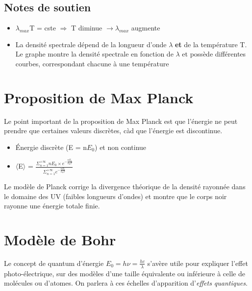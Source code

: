\documentclass{article}
\begin{document}
\subsection{Notes de soutien}
\begin{itemize}
    \item $\lambda_{max}$T = cste $\Longrightarrow$ T diminue $\rightarrow \lambda_{max}$ augmente
    \item La densité spectrale dépend de la longueur d'onde $\lambda$ \textbf{et} de la température T. Le graphe montre la densité spectrale en fonction de $\lambda$ et possède différentes courbes, correspondant chacune à une température
\end{itemize}




\section{Proposition de Max Planck}
Le point important de la proposition de Max Planck est que l'énergie ne peut prendre que certaines valeurs discrètes, càd que l'énergie est discontinue.
\begin{itemize}
    \item Énergie discrète (E = n$E_{0}$) et non continue
    \item $\langle$E$\rangle$ = $\frac{\Sigma_{n=1}^{+\infty} nE_{0} \times e^{-\frac{nE_{0}}{k_{B}T}}}{\Sigma_{n=1}^{+\infty} e^{-\frac{nE_{0}}{k_{B}T}}}$
\end{itemize}
Le modèle de Planck corrige la divergence théorique de la densité rayonnée dans le domaine des UV (faibles longueurs d'ondes) et montre que le corps noir rayonne une énergie totale finie.

\section{Modèle de Bohr}
Le concept de quantum d'énergie $E_{0} = h\nu = \frac{hc}{\lambda}$ s'avère utile pour expliquer l'effet photo-électrique, sur des modèles d'une taille équivalente ou inférieure à celle de molécules ou d'atomes. On parlera à ces échelles d'apparition d'\textit{effets quantiques}.
\end{document}
